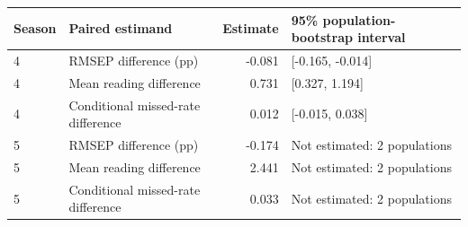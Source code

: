 \begin{tabular}{llrl}
\toprule
Season & Paired estimand & Estimate & 95\% population-bootstrap interval \\
\midrule
4 & RMSEP difference (pp) & -0.081 & [-0.165, -0.014] \\
4 & Mean reading difference & 0.731 & [0.327, 1.194] \\
4 & Conditional missed-rate difference & 0.012 & [-0.015, 0.038] \\
5 & RMSEP difference (pp) & -0.174 & Not estimated: 2 populations \\
5 & Mean reading difference & 2.441 & Not estimated: 2 populations \\
5 & Conditional missed-rate difference & 0.033 & Not estimated: 2 populations \\
\bottomrule
\end{tabular}